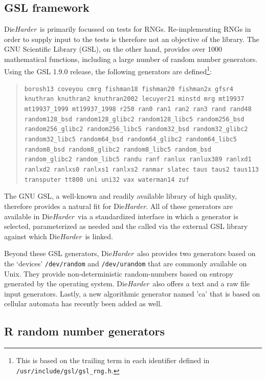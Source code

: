 \documentclass[12pt]{article}
\newcommand{\dieharder}{\textrm{Die}\textsl{Harder}}
\begin{document}
\subsection{GSL framework}

\dieharder\ is primarily focussed on tests for RNGs. Re-implementing RNGs in
order to supply input to the tests is therefore not an objective of the
library.  The GNU Scientific Library (GSL), on the other hand, provides 
over 1000 mathematical functions, including a large number of random number
generators.  Using the GSL 1.9.0 release, the following generators
are defined\footnote{This is based on the trailing term in each identifier
  defined in \texttt{/usr/include/gsl/gsl\_rng.h}.}:
\begin{quote}
  \small
  \texttt{borosh13 coveyou cmrg
    fishman18 fishman20 fishman2x gfsr4 knuthran knuthran2 knuthran2002
    lecuyer21 minstd mrg mt19937 mt19937\_1999 mt19937\_1998 r250 ran0 ran1
    ran2 ran3 rand rand48 random128\_bsd random128\_glibc2 random128\_libc5
    random256\_bsd random256\_glibc2 random256\_libc5 random32\_bsd
    random32\_glibc2 random32\_libc5 random64\_bsd random64\_glibc2
    random64\_libc5 random8\_bsd random8\_glibc2 random8\_libc5 random\_bsd
    random\_glibc2 random\_libc5 randu ranf ranlux ranlux389 ranlxd1 ranlxd2
    ranlxs0 ranlxs1 ranlxs2 ranmar slatec taus taus2 taus113 transputer tt800
    uni uni32 vax waterman14 zuf} 
\end{quote}
The GNU GSL, a well-known and readily available library of high quality,
therefore provides a natural fit for \dieharder. All of these generators are
available in \dieharder\ via a standardized interface in which a generator is
selected, parameterized as needed and the called via the external GSL library
against which \dieharder\ is linked.

Beyond these GSL generators, \dieharder\ also provides two generators based on
the `devices' \texttt{/dev/random} and \texttt{/dev/urandom} that are
commonly available on Unix. They provide non-deterministic random-numbers
based on entropy generated by the operating system. \dieharder\ also offers a
text and a raw file input generators. Lastly, a new algorithmic generator
named 'ca' that is based on cellular automata has recently been added as well.

\subsection{R random number generators}
\end{document}
